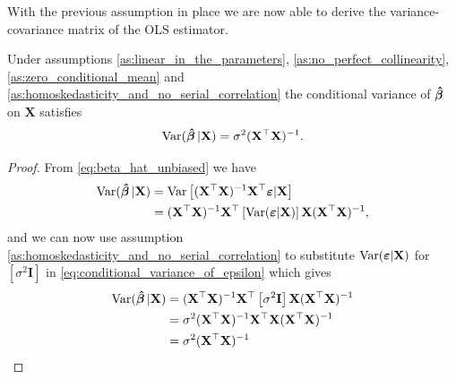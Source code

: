 With the previous assumption in place we are now able to derive the variance-covariance matrix of the OLS estimator.
\begin{theorem}\label{th:variance-covariance_of_the_ols_estimator}
    Under assumptions \ref{as:linear_in_the_parameters}, \ref{as:no_perfect_collinearity}, \ref{as:zero_conditional_mean} and \ref{as:homoskedasticity_and_no_serial_correlation} the conditional variance of $\operatorname{\boldsymbol{\hat{\beta}}}$ on $\mathbf{X}$ satisfies \cite[p. 811]{Wooldridge2012} 
    \begin{align*}
        \operatorname{\text{Var}}(\operatorname{\boldsymbol{\hat{\beta}}} | \mathbf{X}) = \sigma^2(\mathbf{X}^\top\mathbf{X})^{-1}.
    \end{align*}
\end{theorem}
\begin{proof}
    From \eqref{eq:beta_hat_unbiased} we have
    \begin{align}
        \operatorname{\text{Var}}(\operatorname{\boldsymbol{\hat{\beta}}} | \mathbf{X}) &= \operatorname{\text{Var}}\left[ (\mathbf{X}^\top\mathbf{X})^{-1}\mathbf{X}^\top\boldsymbol{\varepsilon}|\mathbf{X} \right] \nonumber\\
        &= (\mathbf{X}^\top\mathbf{X})^{-1}\mathbf{X}^\top\left[ \operatorname{\text{Var}}(\boldsymbol{\varepsilon} | \mathbf{X}) \right] \mathbf{X}(\mathbf{X}^\top\mathbf{X})^{-1}, \label{eq:conditional_variance_of_epsilon}
    \end{align}
    and we can now use assumption \ref{as:homoskedasticity_and_no_serial_correlation} to substitute $\operatorname{\text{Var}}(\boldsymbol{\varepsilon}|\mathbf{X})$ for $\left[\sigma^2 \mathbf{I}\right]$ in \eqref{eq:conditional_variance_of_epsilon} which gives
    \begin{align*}
        \operatorname{\text{Var}}(\operatorname{\boldsymbol{\hat{\beta}}} | \mathbf{X}) &= (\mathbf{X}^\top\mathbf{X})^{-1}\mathbf{X}^\top\left[\sigma^2 \mathbf{I}\right] \mathbf{X}(\mathbf{X}^\top\mathbf{X})^{-1} \\
        &= \sigma^2(\mathbf{X}^\top\mathbf{X})^{-1}\mathbf{X}^\top \mathbf{X}(\mathbf{X}^\top\mathbf{X})^{-1} \\
        &= \sigma^2(\mathbf{X}^\top\mathbf{X})^{-1}
    \end{align*}
\end{proof}

